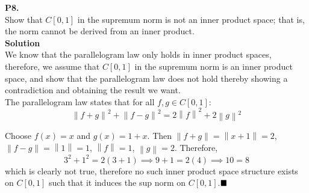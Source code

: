 \documentclass{article}
\newcommand{\norm}[1]{\left\lVert#1\right\rVert}
\begin{document}
    \textbf{P8.}\\

    Show that $C[0,1]$ in the supremum norm is not an inner product space; that is, the norm cannot be derived from an inner
    product.\\

    \textbf{Solution}\\

    We know that the parallelogram law only holds in inner product spaces, therefore, we assume that $C[0,1]$ in the supremum
    norm is an inner product space, and show that the parallelogram law does not hold thereby showing a contradiction and obtaining
    the result we want.\\

    The parallelogram law states that for all $f,g\in C[0,1]$:
    \[ \norm{f+g}^2 + \norm{f-g}^2 = 2\norm{f}^2 + 2\norm{g}^2 \]

    Choose $f(x) = x$ and $g(x) = 1+x$. Then $\norm{f+g} = \norm{x+1} = 2$, $\norm{f-g} = \norm{1} = 1$, $\norm{f} = 1$,
    $\norm{g} = 2$. Therefore,
    \[ 3^2 + 1^2 = 2(3+1) \implies 9 + 1 = 2(4) \implies 10 = 8 \]
    which is clearly not true, therefore no such inner product space structure exists on $C[0,1]$ such that it induces
    the sup norm on $C[0,1]$.$\hfill\blacksquare$
    
\end{document}

